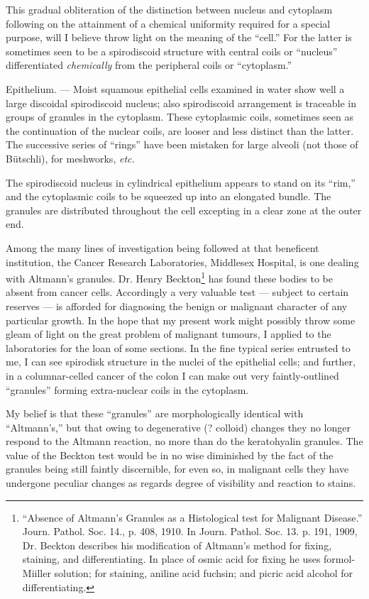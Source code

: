 \documentclass[a4paper, 12pt, oneside]{article}
\begin{document}
This gradual obliteration of the distinction between nucleus and cytoplasm following on the attainment of a chemical uniformity required for a special purpose, will I believe throw light on the meaning of the ``cell.'' For the latter is sometimes seen to be a spirodiscoid structure with central coils or ``nucleus'' differentiated \emph{chemically} from the peripheral coils or ``cytoplasm.''

Epithelium. --- Moist squamous epithelial cells examined in water show well a large discoidal spirodiscoid nucleus; also spirodiscoid arrangement is traceable in groups of granules in the cytoplasm. These cytoplasmic coils, sometimes seen as the continuation of the nuclear coils, are looser and less distinct than the latter. The successive series of ``rings'' have been mistaken for large alveoli (not those of Bütschli), for meshworks, \emph{etc.}

The spirodiscoid nucleus in cylindrical epithelium appears to stand on its ``rim,'' and the cytoplasmic coils to be squeezed up into an elongated bundle. The granules are distributed throughout the cell excepting in a clear zone at the outer end.

Among the many lines of investigation being followed at that beneficent institution, the Cancer Research Laboratories, Middlesex Hospital, is one dealing with Altmann's granules. Dr. Henry Beckton\footnote{``Absence of Altmann's Granules as a Histological test for Malignant Disease.'' Journ. Pathol. Soc. 14., p. 408, 1910. In Journ. Pathol. Soc. 13. p. 191, 1909, Dr. Beckton describes his modification of Altmann's method for fixing, staining, and differentiating. In place of osmic acid for fixing he uses formol-Miiller solution; for staining, aniline acid fuchsin; and picric acid alcohol for differentiating.} has found these bodies to be absent from cancer cells. Accordingly a very valuable test --- subject to certain reserves --- is afforded for diagnosing the benign or malignant character of any particular growth. In the hope that my present work might possibly throw some gleam of light on the great problem of malignant tumours, I applied to the laboratories for the loan of some sections. In the fine typical series entrusted to me, I can see spirodisk structure in the nuclei of the epithelial cells; and further, in a columnar-celled cancer of the colon I can make out very faintly-outlined ``granules'' forming extra-nuclear coils in the cytoplasm.

My belief is that these ``granules'' are morphologically identical with ``Altmann's,'' but that owing to degenerative (? colloid) changes they no longer respond to the Altmann reaction, no more than do the keratohyalin granules. The value of the Beckton test would be in no wise diminished by the fact of the granules being still faintly discernible, for even so, in malignant cells they have undergone peculiar changes as regards degree of visibility and reaction to stains.
\end{document}
